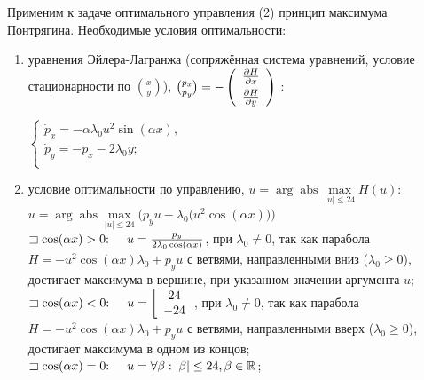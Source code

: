 \documentclass[a4paper,12pt,oneside]{article}
\numberwithin{equation}{section}
\numberwithin{table}{section}
\numberwithin{figure}{section}
\newcommand*\absc[1]{|{#1}|}
\DeclareMathOperator\abs{abs}
\begin{document}
Применим к задаче оптимального управления (2) принцип максимума Понтрягина. Необходимые
условия оптимальности:
\begin{enumerate}
    \item уравнения Эйлера-Лагранжа (сопряжённая система уравнений, условие стационарности по $\binom{x}{y}$), 
    $
        \binom{\dot{p}_x}{\dot{p}_y}
        =-
        \left(
            \begin{array}{c}
            \frac{\partial H}{\partial x}
            \vspace{0.15cm} \\
            \frac{\partial H}{\partial y}
            \end{array}
        \right)
    $ : \\
    \begin{center}
        $
        \begin{cases}
            \dot{p}_x = - \alpha \lambda_0 u^2 \sin (\alpha x),\\
            \dot{p}_y = - p_x - 2 \lambda_0 y ;\\
        \end{cases}
        $
    \end{center}
    \item условие оптимальности по управлению, $u = \arg \abs \max\limits_{\absc{u} \leq 24}{H(u)}$: \\
    $u = \arg \abs \max\limits_{\absc{u} \leq 24}{\Big(p_y u - \lambda_0 \big(u^2 \cos (\alpha x)\big)\Big)}$ \\
    
    $ \sqsupset\cos (\alpha x) > 0 \text{: \quad}
    u = \frac{p_y}{2 \lambda_0 \cos (\alpha x)}$, при 
    $
        \lambda_0 \neq 0 
    $, так как парабола $H = -  u^2 \cos (\alpha x) \lambda_0 + p_y u$ с ветвями, направленными вниз ($\lambda_0 \geq 0$), достигает максимума в вершине, при указанном значении аргумента $u$; \\
    $ \sqsupset\cos (\alpha x) < 0 \text{: \quad}
    u = \left[ \begin{array}{c} 24 \\ -24 \end{array} \right.$, при 
    $
        \lambda_0 \neq 0 
    $, так как парабола $H = -  u^2 \cos (\alpha x) \lambda_0 + p_y u$ с ветвями, направленными вверх ($\lambda_0 \geq 0$), достигает максимума в одном из концов; \\
    
    $ \sqsupset\cos (\alpha x) = 0 \text{: \quad}
    u = \forall \beta: \absc{\beta}  \leq 24, \beta \in \mathbb{R} $; \\
    

\end{enumerate}
\end{document}
